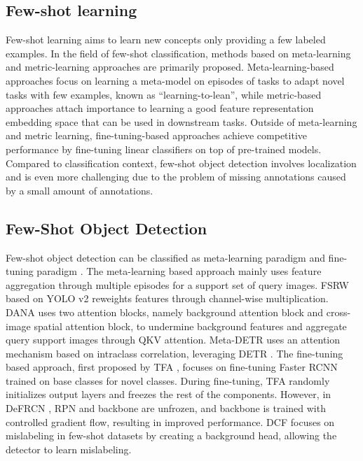 \documentclass{article}
\begin{document}
\subsection{Few-shot learning}
Few-shot learning aims to learn new concepts only providing a few labeled examples. In the field of few-shot classification, methods based on meta-learning \cite{metasurvey, maml, metasgd,latent} and metric-learning approaches \cite{siam, matching, dynamic} are primarily proposed. Meta-learning-based approaches focus on learning a meta-model on episodes of tasks to adapt novel tasks with few examples, known as ``learning-to-lean'', 
while metric-based approaches attach importance to learning a good feature representation embedding space that can be used in downstream tasks. 
Outside of meta-learning and metric learning, fine-tuning-based approaches \cite{closer, rethink} achieve competitive performance by fine-tuning linear classifiers on top of pre-trained models.
Compared to classification context, few-shot object detection involves localization and is even more challenging due to the problem of missing annotations caused by a small amount of annotations.

\subsection{Few-Shot Object Detection}
Few-shot object detection can be classified as meta-learning paradigm \cite{metayolo, metadetr, metarcnn, dana, metadet, fsview} and fine-tuning paradigm \cite{tfa,defrcn,dcf, fssp}. The meta-learning based approach mainly uses feature aggregation through multiple episodes for a support set of query images. FSRW \cite{metayolo} based on YOLO v2 \cite{yolov2} reweights features through channel-wise multiplication. DANA \cite{dana} uses two attention blocks, namely background attention block and cross-image spatial attention block, to undermine background features and aggregate query support images through QKV attention. Meta-DETR \cite{metadetr} uses an attention mechanism based on intraclass correlation, leveraging DETR \cite{detr}. The fine-tuning based approach, first proposed by TFA \cite{tfa}, focuses on fine-tuning Faster RCNN \cite{faster} trained on base classes for novel classes. During fine-tuning, TFA randomly initializes output layers and freezes the rest of the components. However, in DeFRCN \cite{defrcn}, RPN and backbone are unfrozen, and backbone is trained with controlled gradient flow, resulting in improved performance. DCF \cite{dcf} focuses on mislabeling in few-shot datasets by creating a background head, allowing the detector to learn mislabeling.
\end{document}
